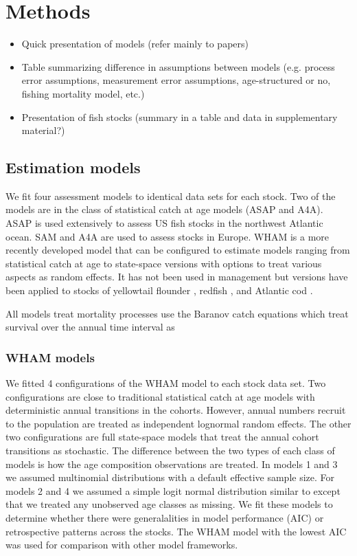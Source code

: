 \documentclass[12pt,letterpaper, leqno]{article}
\begin{document}
\section*{Methods}

\begin{itemize}
\item Quick presentation of models (refer mainly to papers)
\item Table summarizing difference in assumptions between models (e.g. process error assumptions, measurement error assumptions, age-structured or no, fishing mortality model, etc.)
\item Presentation of fish stocks (summary in a table and data in supplementary material?)
\end{itemize}

\subsection*{Estimation models}

We fit four assessment models to identical data sets for each stock. Two of the models are in the class of statistical catch at age models (ASAP and A4A). ASAP is used extensively to assess US fish stocks in the northwest Atlantic ocean. SAM and A4A are used to assess stocks in Europe. WHAM is a more recently developed model that can be configured to estimate models ranging from statistical catch at age to state-space versions with options to treat various aspects as random effects. It has not been used in management but versions have been applied to stocks of yellowtail flounder \citep{milleretal16}, redfish \citep{millerhyun18}, and Atlantic cod \citep{milleretal18}.

All models treat mortality processes use the Baranov catch equations which treat survival over the annual time interval as

\subsubsection*{WHAM models}

We fitted 4 configurations of the WHAM model to each stock data set. Two configurations are close to traditional statistical catch at age models with deterministic annual transitions in the cohorts. However, annual numbers recruit to the population are treated as independent lognormal random effects. The other two configurations are full state-space models that treat the annual cohort transitions as stochastic. The difference between the two types of each class of models is how the age composition observations are treated. In models 1 and 3 we assumed multinomial distributions with a default effective sample size. For models 2 and 4 we assumed a simple logit normal distribution similar to \citet{milleretal16} except that we treated any unobserved age classes as missing. We fit these models to determine whether there were generalalities in model performance (AIC) or retrospective patterns across the stocks. The WHAM model with the lowest AIC was used for comparison with other model frameworks.
\end{document}
